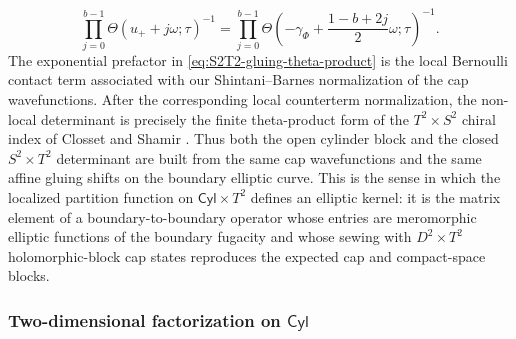 \documentclass[11pt,a4paper]{article}
\numberwithin{equation}{section}
\theoremstyle{plain}
\theoremstyle{definition}
\theoremstyle{remark}
\newcommand{\cyl}{\mathsf{Cyl}}
\begin{document}
\begin{equation}
\prod_{j=0}^{b-1}
\Theta(u_+ + j\omega;\tau)^{-1}
=
\prod_{j=0}^{b-1}
\Theta\!\left(-\gamma_\Phi+\frac{1-b+2j}{2}\omega;\tau\right)^{-1}.
\label{eq:S2T2-Closset-Shamir-form-positive-flux}
\end{equation}
The exponential prefactor in \eqref{eq:S2T2-gluing-theta-product} is the local Bernoulli contact term associated with our Shintani--Barnes normalization of the cap wavefunctions.  After the corresponding local counterterm normalization, the non-local determinant is precisely the finite theta-product form of the \(T^2\times S^2\) chiral index of Closset and Shamir \cite{Closset:2013sxa}.  Thus both the open cylinder block and the closed \(S^2\times T^2\) determinant are built from the same cap wavefunctions and the same affine gluing shifts on the boundary elliptic curve.  This is the sense in which the localized partition function on \(\cyl\times T^2\) defines an elliptic kernel: it is the matrix element of a boundary-to-boundary operator whose entries are meromorphic elliptic functions of the boundary fugacity and whose sewing with \(D^2\times T^2\) holomorphic-block cap states reproduces the expected cap and compact-space blocks.


\subsubsection{Two-dimensional factorization on \texorpdfstring{\(\cyl\)}{Cyl}}
\label{subsubsec:two-dimensional-factorization-cylinder}
\end{document}

